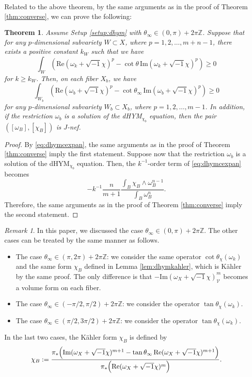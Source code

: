 \documentclass{amsart}
\numberwithin{equation}{section}
\theoremstyle{plain}
\newtheorem{theorem}[equation]{Theorem}
\theoremstyle{definition}
\theoremstyle{remark}
\newtheorem{remark}[equation]{Remark}
\begin{document}
Related to the above theorem, by the same arguments as in the proof of Theorem \ref{thm:converse}, we can prove the following:
\begin{theorem}\label{thm:dhym_converse}
    Assume Setup \ref{setup:dhym} with $\theta_\infty\in(0,\pi)+2\pi\mathbb{Z}$. Suppose that for any $p$-dimensional subvariety $W\subset X$, where $p=1,2,\dots,{m+n-1}$, there exists a positive constant $k_W$ such that we have
    $$\int_W\left(\mathrm{Re}(\omega_k+\sqrt{-1}\chi)^p-\cot\theta\, \mathrm{Im}(\omega_k+\sqrt{-1}\chi)^p\right)\ge0$$
    for $k\ge k_W$. Then, on each fiber $X_b$, we have
    $$\int_{W_b}\left(\mathrm{Re}(\omega_b+\sqrt{-1}\chi)^p-\cot\theta_\infty\, \mathrm{Im}(\omega_b+\sqrt{-1}\chi)^p\right)\ge0$$
    for any $p$-dimensional subvariety $W_b\subset X_b$, where $p=1,2,\dots,m-1$. In addition, if the restriction $\omega_b$ is a solution of the dHYM$_{\chi_b}$ equation, then the pair $([\omega_B],[\chi_B])$ is $J$-nef.
\end{theorem}

\begin{proof}
   By \eqref{eq:dhymcexpan}, the same arguments as in the proof of Theorem \ref{thm:converse} imply the first statement. Suppose now that the restriction $\omega_b$ is a solution of the dHYM$_{\chi_b}$ equation. Then, the $k^{-1}$-order term of \eqref{eq:dhymcexpan} becomes
    $$-k^{-1}\frac{n}{m+1}\frac{\int_B\chi_B\wedge\omega_B^{n-1}}{\int_B\omega_B^n}.$$
    Therefore, the same arguments as in the proof of Theorem \ref{thm:converse} imply the second statement.
\end{proof}

\begin{remark}\label{rem:other}
    In this paper, we discussed the case $\theta_\infty\in(0,\pi)+2\pi\mathbb{Z}$. The other cases can be treated by the same manner as follows.
    \begin{itemize}
        \item The case $\theta_\infty\in(\pi,2\pi)+2\pi\mathbb{Z}$: we consider the same operator $\cot\theta_\chi(\omega_k)$ and the same form $\chi_B$ defined in Lemma \ref{lem:dhymkahler}, which is K{\"a}hler by the same proof. The only difference is that $-\mathrm{Im}(\omega_X+\sqrt{-1}\chi)^m_{\mathcal{V}}$ becomes a volume form on each fiber.
        \item The case $\theta_\infty\in(-\pi/2,\pi/2)+2\pi\mathbb{Z}$: we consider the operator $\tan\theta_\chi(\omega_k)$.
        \item The case $\theta_\infty\in(\pi/2,3\pi/2)+2\pi\mathbb{Z}$: we consider the operator $\tan\theta_\chi(\omega_k)$.
    \end{itemize}
    In the last two cases, the K{\"a}hler form $\chi_B$ is defined by 
    $$\chi_B:=\frac{\pi_*\Bigl(\mathrm{Im}(\omega_X+\sqrt{-1}\chi)^{m+1}-\tan\theta_\infty\,\mathrm{Re}(\omega_X+\sqrt{-1}\chi)^{m+1}\Bigr)}{\pi_*\Bigl(\mathrm{Re}(\omega_X+\sqrt{-1}\chi)^m\Bigr)}.$$
\end{remark}
\end{document}
